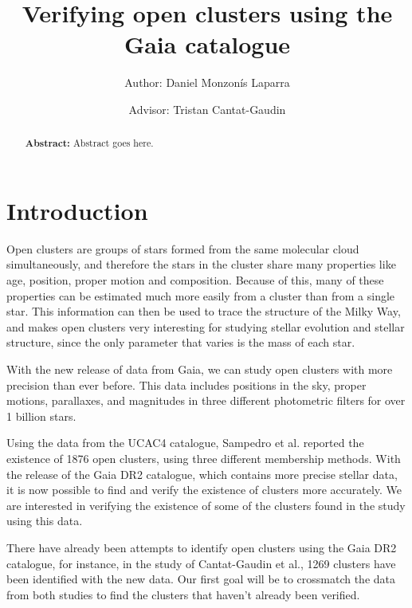 \documentclass[twocolumn]{revtex4}
\begin{document}
\pagestyle{fancy}


\title{Verifying open clusters using the Gaia catalogue}
\author{Author: Daniel Monzonís Laparra}
\author{Advisor: Tristan Cantat-Gaudin}

\begin{abstract}
{\bf Abstract:} Abstract goes here.
\end{abstract}

\maketitle



\section{Introduction}
Open clusters are groups of stars formed from the same molecular cloud simultaneously, and therefore the stars in the cluster share many properties like age, position, proper motion and composition. Because of this, many of these properties can be estimated much more easily from a cluster than from a single star. This information can then be used to trace the structure of the Milky Way, and makes open clusters very interesting for studying stellar evolution and stellar structure, since the only parameter that varies is the mass of each star.

With the new release of data from Gaia, we can study open clusters with more precision than ever before. This data includes positions in the sky, proper motions, parallaxes, and magnitudes in three different photometric filters for over 1 billion stars.

Using the data from the UCAC4 catalogue, Sampedro et al.\cite{sampedro} reported the existence of 1876 open clusters, using three different membership methods. With the release of the Gaia DR2 catalogue, which contains more precise stellar data, it is now possible to find and verify the existence of clusters more accurately. We are interested in verifying the existence of some of the clusters found in the study using this data.

There have already been attempts to identify open clusters using the Gaia DR2 catalogue, for instance, in the study of Cantat-Gaudin et al.\cite{cantat-gaudin}, 1269 clusters have been identified with the new data. Our first goal will be to crossmatch the data from both studies to find the clusters that haven't already been verified.
\end{document}
